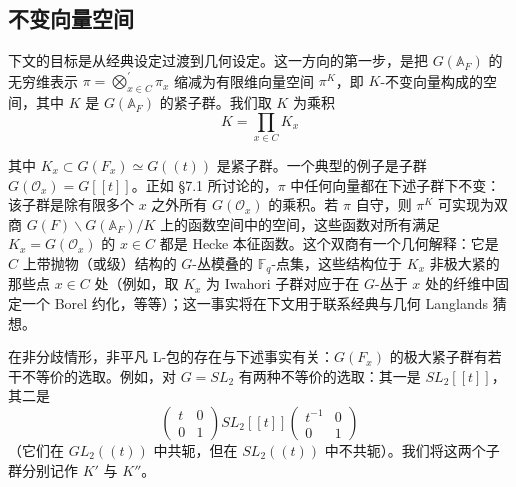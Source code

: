 \documentclass[11pt,a4paper]{article}
\newcommand{\Bun}{\mathrm{Bun}}
\begin{document}
\subsection{不变向量空间}

下文的目标是从经典设定过渡到几何设定。这一方向的第一步，是把 $G(\mathbb{A}_F)$ 的无穷维表示 $\pi=\bigotimes_{x\in C}^{\prime}\pi_x$ 缩减为有限维向量空间 $\pi^K$，即 $K$-不变向量构成的空间，其中 $K$ 是 $G(\mathbb{A}_F)$ 的紧子群。我们取 $K$ 为乘积
\[
K=\prod_{x\in C}K_x
\]


其中 $K_x\subset G(F_x)\simeq G((t))$ 是紧子群。一个典型的例子是子群 $G(\mathcal{O}_x)=G[[t]]$。正如 §7.1 所讨论的，$\pi$ 中任何向量都在下述子群下不变：该子群是除有限多个 $x$ 之外所有 $G(\mathcal{O}_x)$ 的乘积。若 $\pi$ 自守，则 $\pi^K$ 可实现为双商 $G(F)\backslash G(\mathbb{A}_F)/K$ 上的函数空间中的空间，这些函数对所有满足 $K_x=G(\mathcal{O}_x)$ 的 $x\in C$ 都是 Hecke 本征函数。这个双商有一个几何解释：它是 $C$ 上带抛物（或级）结构的 $G$-丛模叠的 $\mathbb{F}_q$-点集，这些结构位于 $K_x$ 非极大紧的那些点 $x\in C$ 处（例如，取 $K_x$ 为 Iwahori 子群对应于在 $G$-丛于 $x$ 处的纤维中固定一个 Borel 约化，等等）；这一事实将在下文用于联系经典与几何 Langlands 猜想。

在非分歧情形，非平凡 L-包的存在与下述事实有关：$G(F_x)$ 的极大紧子群有若干不等价的选取。例如，对 $G=SL_2$ 有两种不等价的选取：其一是 $SL_2[[t]]$，其二是
\begin{equation}\tag{7.7}
\begin{pmatrix}t&0\\ 0&1\end{pmatrix}SL_2[[t]]\begin{pmatrix}t^{-1}&0\\ 0&1\end{pmatrix}
\end{equation}
（它们在 $GL_2((t))$ 中共轭，但在 $SL_2((t))$ 中不共轭）。我们将这两个子群分别记作 $K'$ 与 $K''$。
\end{document}
